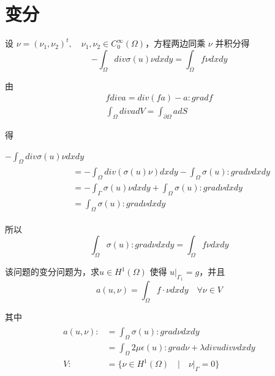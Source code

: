 \documentclass[UTF8,titlepage,twocolumn]{ctexart}
\begin{document}
\section{变分}

设 $\nu = (\nu_1,\nu_2)^t, \quad \nu_1, \nu_2 \in C_0^{\infty}(\Omega)$，方程两边同乘 $\nu$ 并积分得
$$
-\int_{\Omega} div \sigma(u) \nu dxdy = \int_{\Omega} f \nu dxdy
$$

由
$$
\begin{matrix}
	f div a = div(fa) - a : grad f \\
	\int_{\Omega} div a dV = \int_{\partial \Omega} a dS
\end{matrix}
$$

得
\par \quad \quad
$-\int_{\Omega} div \sigma(u) \nu dxdy$
$$ 
\quad \quad
\begin{matrix}
	\begin{aligned}
		&= -\int_{\Omega} div(\sigma(u) \nu) dxdy - \int_{\Omega} \sigma(u) : grad \nu dxdy \\
		&= -\int_{\Gamma} \sigma(u) \nu dxdy + \int_{\Omega} \sigma(u) : grad \nu dxdy \\
		&= \int_{\Omega} \sigma(u) : grad \nu dxdy 
	\end{aligned}
\end{matrix}
$$

所以
$$
\int_{\Omega} \sigma(u) : grad \nu dxdy = \int_{\Omega} f \nu dxdy
$$

该问题的变分问题为，求$u \in H^1(\Omega)$ 使得 $u |_{\Gamma_1} = g$，并且
$$
	a(u,\nu) = \int_{\Omega} f \cdot \nu dxdy \quad \forall \nu \in V
$$ 
\par
其中
$$
	\begin{matrix}
		\begin{aligned}
			a(u,\nu) :&= \int_{\Omega} \sigma(u) : grad \nu dxdy \\  
			&= \int_{\Omega} 2 \mu \epsilon(u) : grad \nu + \lambda div u div \nu dxdy \\
			V :&= \{ \nu \in H^1(\Omega) \quad | \quad \nu |_{\Gamma} = 0 \}
		\end{aligned}
	\end{matrix}
$$


\end{document}
